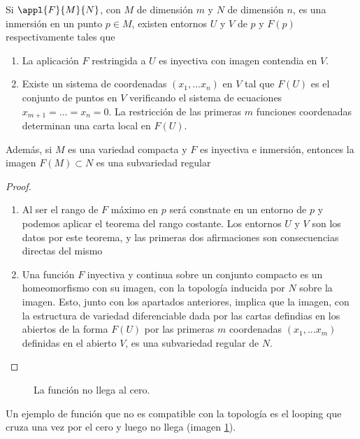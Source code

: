 \begin{theorem}
Si $\appl{F}{M}{N}$, con $M$ de dimensión $m$ y $N$ de dimensión $n$, es una inmersión en un punto $p \in M$, existen entornos $U$ y $V$ de $p$ y $F(p)$ respectivamente tales que
\begin{enumerate}
\item La aplicación $F$ restringida a $U$ es inyectiva con imagen contendia en $V$.
\item Existe un sistema de coordenadas $(x_1,...x_n)$ en $V$ tal que $F(U)$ es el conjunto de puntos en $V$ verificando el sistema de ecuaciones $x_{m+1}=...=x_n=0$. La restricción de las primeras $m$ funciones coordenadas determinan una carta local en $F(U)$.
\end{enumerate}

Además, si $M$ es una variedad compacta y $F$ es inyectiva e inmersión, entonces la imagen $F(M)\subset N$ es una subvariedad regular
\end{theorem}
\begin{proof}
\begin{enumerate}
\item Al ser el rango de $F$ máximo en $p$ será constnate en un entorno de $p$ y podemos aplicar el teorema del rango costante. Los entornos $U$ y $V$ son los datos por este teorema, y las primeras dos afirmaciones son consecuencias directas del mismo

\item Una función $F$ inyectiva y continua sobre un conjunto compacto es un homeomorfismo con su imagen, con la topología inducida por $N$ sobre la imagen. Esto, junto con los apartados anteriores, implica que la imagen, con la estructura de variedad diferenciable dada por las cartas defindias en los abiertos de la forma $F(U)$ por las primeras $m$ coordenadas $(x_1,...x_m)$ definidas en el abierto $V$, es una subvariedad regular de $N$.
\end{enumerate}
\end{proof}

\begin{example}

\begin{figure}[hbtp]
\centering
{}
\caption{La función no llega al cero.}
\label{figBucleCero}
\end{figure}

Un ejemplo de función que no es compatible con la topología es el looping que cruza una vez por el cero y luego no llega (imagen \ref{figBucleCero}).
\end{example}

